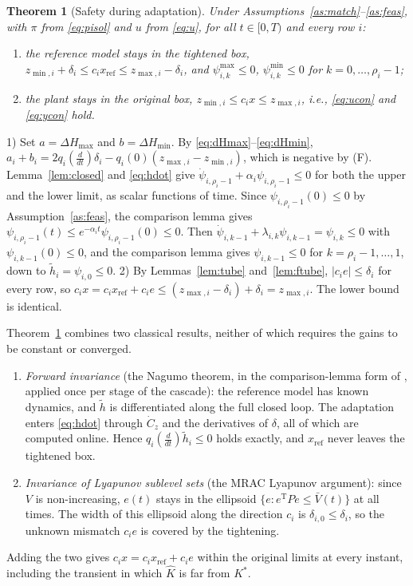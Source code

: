 \documentclass[lettersize,journal]{IEEEtran}
\newtheorem{theorem}{Theorem}
\newcommand{\Kh}{\hat{K}}
\newcommand{\xr}{x_{\mathrm{ref}}}
\newcommand{\Vb}{\bar{V}}
\newcommand{\T}{\mathrm{T}}
\begin{document}
\begin{theorem}[Safety during adaptation] \label{th:safe}
Under Assumptions~\ref{as:match}--\ref{as:feas}, with $\pi$ from \eqref{eq:pisol} and $u$ from \eqref{eq:u}, for all $t\in[0,T)$ and every row $i$:
\begin{enumerate}
\item the reference model stays in the tightened box, $z_{\min,i}+\delta_i\le c_i\xr\le z_{\max,i}-\delta_i$, and $\psi^{\max}_{i,k}\le0$, $\psi^{\min}_{i,k}\le0$ for $k=0,\dots,\rho_i-1$;
\item the plant stays in the original box, $z_{\min,i}\le c_i x\le z_{\max,i}$, i.e., \eqref{eq:ucon} and \eqref{eq:ycon} hold.
\end{enumerate}
\end{theorem}
\begin{IEEEproof}
1) Set $a=\Delta H_{\max}$ and $b=\Delta H_{\min}$. By \eqref{eq:dHmax}--\eqref{eq:dHmin}, $a_i+b_i=2q_i(\frac{d}{dt})\delta_i-q_i(0)(z_{\max,i}-z_{\min,i})$, which is negative by (F). Lemma~\ref{lem:closed} and \eqref{eq:hdot} give $\dot\psi_{i,\rho_i-1}+\alpha_i\psi_{i,\rho_i-1}\le0$ for both the upper and the lower limit, as scalar functions of time. Since $\psi_{i,\rho_i-1}(0)\le0$ by Assumption~\ref{as:feas}, the comparison lemma \cite[Lemma~3.4]{khalil2002} gives $\psi_{i,\rho_i-1}(t)\le e^{-\alpha_it}\psi_{i,\rho_i-1}(0)\le0$. Then $\dot\psi_{i,k-1}+\lambda_{i,k}\psi_{i,k-1}=\psi_{i,k}\le0$ with $\psi_{i,k-1}(0)\le0$, and the comparison lemma gives $\psi_{i,k-1}\le0$ for $k=\rho_i-1,\dots,1$, down to $\tilde h_i=\psi_{i,0}\le0$. 2) By Lemmas~\ref{lem:tube} and~\ref{lem:ftube}, $|c_ie|\le\delta_i$ for every row, so $c_ix=c_i\xr+c_ie\le(z_{\max,i}-\delta_i)+\delta_i=z_{\max,i}$. The lower bound is identical.
\end{IEEEproof}

Theorem~\ref{th:safe} combines two classical results, neither of which requires the gains to be constant or converged.
\begin{enumerate}
\item \emph{Forward invariance} (the Nagumo theorem, in the comparison-lemma form of \cite[Lemma~2]{lavretsky2025}, applied once per stage of the cascade): the reference model has known dynamics, and $\tilde h$ is differentiated along the full closed loop. The adaptation enters \eqref{eq:hdot} through $\dot C_z$ and the derivatives of $\delta$, all of which are computed online. Hence $q_i(\frac{d}{dt})\tilde h_i\le0$ holds exactly, and $\xr$ never leaves the tightened box.
\item \emph{Invariance of Lyapunov sublevel sets} (the MRAC Lyapunov argument): since $V$ is non-increasing, $e(t)$ stays in the ellipsoid $\{e: e^\T Pe\le\Vb(t)\}$ at all times. The width of this ellipsoid along the direction $c_i$ is $\delta_{i,0}\le\delta_i$, so the unknown mismatch $c_ie$ is covered by the tightening.
\end{enumerate}
Adding the two gives $c_ix=c_i\xr+c_ie$ within the original limits at every instant, including the transient in which $\Kh$ is far from $K^*$.
\end{document}
